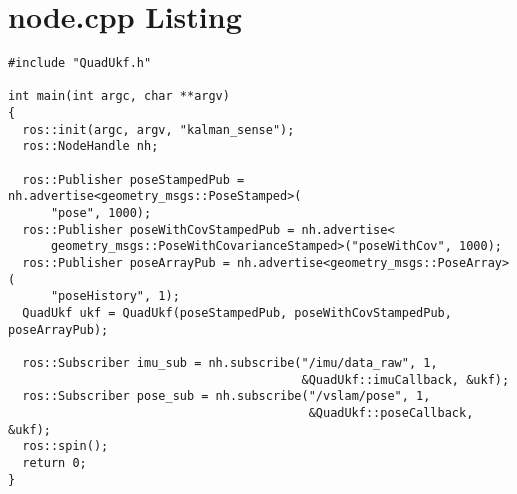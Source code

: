 \chapter{node.cpp Listing}

\begin{verbatim}
#include "QuadUkf.h"

int main(int argc, char **argv)
{
  ros::init(argc, argv, "kalman_sense");
  ros::NodeHandle nh;

  ros::Publisher poseStampedPub = nh.advertise<geometry_msgs::PoseStamped>(
      "pose", 1000);
  ros::Publisher poseWithCovStampedPub = nh.advertise<
      geometry_msgs::PoseWithCovarianceStamped>("poseWithCov", 1000);
  ros::Publisher poseArrayPub = nh.advertise<geometry_msgs::PoseArray>(
      "poseHistory", 1);
  QuadUkf ukf = QuadUkf(poseStampedPub, poseWithCovStampedPub, poseArrayPub);

  ros::Subscriber imu_sub = nh.subscribe("/imu/data_raw", 1,
                                         &QuadUkf::imuCallback, &ukf);
  ros::Subscriber pose_sub = nh.subscribe("/vslam/pose", 1,
                                          &QuadUkf::poseCallback, &ukf);
  ros::spin();
  return 0;
}
\end{verbatim}